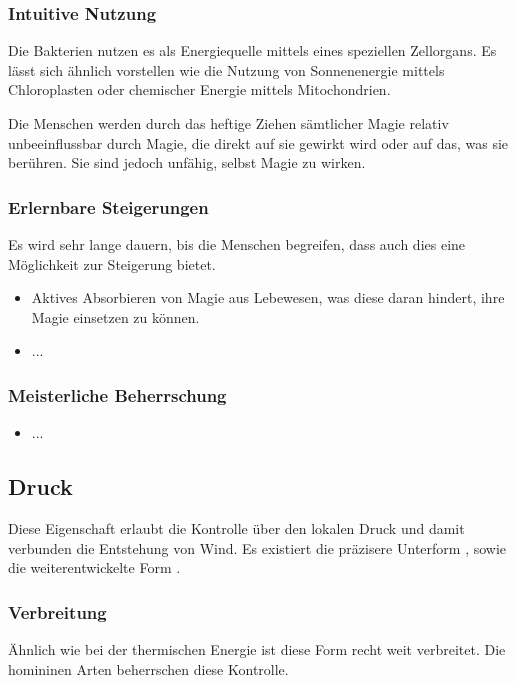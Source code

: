 \subsubsection{Intuitive Nutzung}
Die Bakterien nutzen es als Energiequelle mittels eines speziellen Zellorgans. Es lässt sich ähnlich vorstellen wie die Nutzung von Sonnenenergie mittels Chloroplasten oder chemischer Energie mittels Mitochondrien. 

Die Menschen werden durch das heftige Ziehen sämtlicher Magie relativ unbeeinflussbar durch Magie, die direkt auf sie gewirkt wird oder auf das, was sie berühren. Sie sind jedoch unfähig, selbst Magie zu wirken.

\subsubsection{Erlernbare Steigerungen}
Es wird sehr lange dauern, bis die Menschen begreifen, dass auch dies eine Möglichkeit zur Steigerung bietet.
\begin{itemize}
	\item Aktives Absorbieren von Magie aus Lebewesen, was diese daran hindert, ihre Magie einsetzen zu können.
	\item ...
\end{itemize}

\subsubsection{Meisterliche Beherrschung} 
\begin{itemize}
	\item ...
\end{itemize}




\subsection{Druck}\label{sec:druckmagie}
Diese Eigenschaft erlaubt die Kontrolle über den lokalen Druck und damit verbunden die Entstehung von Wind. Es existiert die präzisere Unterform , sowie die weiterentwickelte Form .

\subsubsection{Verbreitung}
Ähnlich wie bei der thermischen Energie ist diese Form recht weit verbreitet. Die homininen Arten beherrschen diese Kontrolle. 

